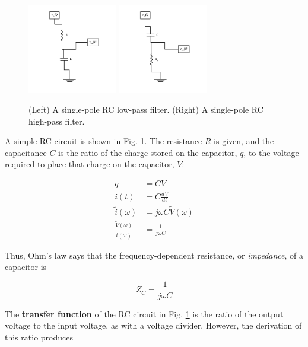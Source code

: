 \documentclass[12pt]{article}
\begin{document}
\begin{figure}
\centering
\includegraphics[width=0.35\textwidth,trim=0cm 1cm 0cm 0cm,clip=true]{LowPass.pdf}
\includegraphics[width=0.35\textwidth,trim=0cm 1cm 0cm 0cm,clip=true]{HighPass.pdf}
\caption{\label{fig:fig2} (Left) A single-pole RC low-pass filter. (Right) A single-pole RC high-pass filter.}
\end{figure}

A simple RC circuit is shown in Fig. \ref{fig:fig2}.  The resistance $R$ is given, and the capacitance $C$ is the ratio of the charge stored on the capacitor, $q$, to the voltage required to place that charge on the capacitor, $V$:

\begin{align}
q &= CV \\
i(t) &= C \frac{dV}{dt} \\
\tilde{i}(\omega) &= j\omega C \tilde{V}(\omega) \\
\frac{\tilde{V}(\omega)}{\tilde{i}(\omega)} &= \frac{1}{j\omega C}
\end{align}

Thus, Ohm's law says that the frequency-dependent resistance, or \textit{impedance}, of a capacitor is

\begin{equation}
\boxed{
Z_C = \frac{1}{j\omega C}
}
\label{eq:eq5}
\end{equation}

The \textbf{transfer function} of the RC circuit in Fig. \ref{fig:fig2} is the ratio of the output voltage to the input voltage, as with a voltage divider.  However, the derivation of this ratio produces
\end{document}
